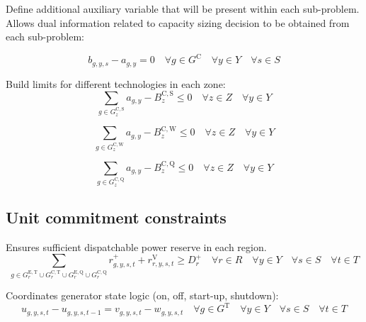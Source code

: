 \documentclass{article}
\newcommand{\sGeneratorsExistingThermal}{G^{\mathrm{E,T}}}
\newcommand{\sGeneratorsCandidate}{G^{\mathrm{C}}}
\newcommand{\sGeneratorsCandidateThermal}{G^{\mathrm{C,T}}}
\newcommand{\sGeneratorsCandidateWind}{G^{\mathrm{C,W}}}
\newcommand{\sGeneratorsCandidateSolar}{G^{\mathrm{C,S}}}
\newcommand{\sGeneratorsThermal}{G^{\mathrm{T}}}
\newcommand{\sStorageExisting}{G^{\mathrm{E,Q}}}
\newcommand{\sStorageCandidate}{G^{\mathrm{C,Q}}}
\newcommand{\sYears}{Y}
\newcommand{\sScenarios}{S}
\newcommand{\sIntervals}{T}
\newcommand{\sZones}{Z}
\newcommand{\sRegions}{R}
\newcommand{\iGenerator}{g}
\newcommand{\iYear}{y}
\newcommand{\iScenario}{s}
\newcommand{\iInterval}{t}
\newcommand{\iZone}{z}
\newcommand{\iRegion}{r}
\newcommand{\cBuildLimit}[1][]{B^{\mathrm{C,#1}}_{\iZone}}
\newcommand{\cReserveUpRequirement}[1][\iRegion]{D^{+}_{#1}}
\newcommand{\vStartupIndicator}[1][\iGenerator,\iYear,\iScenario,\iInterval]{v_{#1}}
\newcommand{\vShutdownIndicator}[1][\iGenerator,\iYear,\iScenario,\iInterval]{w_{#1}}
\newcommand{\vReserveUp}[1][\iGenerator,\iYear,\iScenario,\iInterval]{r^{+}_{#1}}
\newcommand{\vReserveUpViolation}[1][\iRegion,\iYear,\iScenario,\iInterval]{r^{\mathrm{V}}_{#1}}
\newcommand{\vOnIndicator}[1][\iGenerator,\iYear,\iScenario,\iInterval]{u_{#1}}
\newcommand{\vInstalledCapacityTotal}[1][\iGenerator,\iYear]{a_{#1}}
\newcommand{\vInstalledCapacityTotalScenario}[1][\iGenerator,\iYear,\iScenario]{b_{#1}}
\begin{document}
Define additional auxiliary variable that will be present within each sub-problem. Allows dual information related to capacity sizing decision to be obtained from each sub-problem:

\begin{equation}
\vInstalledCapacityTotalScenario - \vInstalledCapacityTotal = 0 \quad \forall \iGenerator \in \sGeneratorsCandidate \quad \forall \iYear \in \sYears \quad \forall \iScenario \in \sScenarios
\end{equation}


Build limits for different technologies in each zone:
\begin{equation}
\sum\limits_{\iGenerator \in \sGeneratorsCandidateSolar_{\iZone}} \vInstalledCapacityTotal - \cBuildLimit[S] \leq 0 \quad \forall \iZone \in \sZones \quad \forall \iYear \in \sYears
\end{equation}

\begin{equation}
\sum\limits_{\iGenerator \in \sGeneratorsCandidateWind_{\iZone}} \vInstalledCapacityTotal - \cBuildLimit[W] \leq 0 \quad \forall \iZone \in \sZones \quad \forall \iYear \in \sYears 
\end{equation}

\begin{equation}
\sum\limits_{\iGenerator \in \sStorageCandidate_{\iZone}} \vInstalledCapacityTotal - \cBuildLimit[Q] \leq 0  \quad \forall \iZone \in \sZones \quad \forall \iYear \in \sYears
\label{eqn: storage build limits}
\end{equation}

\subsection{Unit commitment constraints}
Ensures sufficient dispatchable power reserve in each region.
\begin{equation}
\sum\limits_{\iGenerator \in \sGeneratorsExistingThermal_{\iRegion} \cup \sGeneratorsCandidateThermal_{\iRegion} \cup \sStorageExisting_{\iRegion} \cup \sStorageCandidate_{\iRegion}} \vReserveUp + \vReserveUpViolation \geq \cReserveUpRequirement \quad \forall \iRegion \in \sRegions \quad \forall \iYear \in \sYears \quad \forall \iScenario \in \sScenarios \quad \forall \iInterval \in \sIntervals
\label{eqn: reserve constraints}
\end{equation}

Coordinates generator state logic (on, off, start-up, shutdown):
\begin{equation}
\vOnIndicator - \vOnIndicator[\iGenerator,\iYear,\iScenario,\iInterval-1] = \vStartupIndicator - \vShutdownIndicator \quad \forall \iGenerator \in \sGeneratorsThermal \quad \forall \iYear \in \sYears \quad \forall \iScenario \in \sScenarios \quad \forall \iInterval \in \sIntervals
\end{equation}
\end{document}
